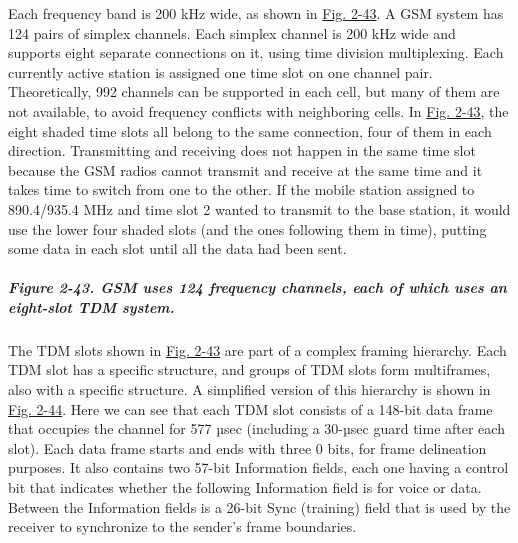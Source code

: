 Each frequency band is 200 kHz wide, as shown in
\protect\hyperlink{0130661023_ch02lev1sec6.htmlux5cux23ch02fig43}{Fig.
2-43}. A GSM system has 124 pairs of simplex channels. Each simplex
channel is 200 kHz wide and supports eight separate connections on it,
using time division multiplexing. Each currently active station is
assigned one time slot on one channel pair. Theoretically, 992 channels
can be supported in each cell, but many of them are not available, to
avoid frequency conflicts with neighboring cells. In
\protect\hyperlink{0130661023_ch02lev1sec6.htmlux5cux23ch02fig43}{Fig.
2-43}, the eight shaded time slots all belong to the same connection,
four of them in each direction. Transmitting and receiving does not
happen in the same time slot because the GSM radios cannot transmit and
receive at the same time and it takes time to switch from one to the
other. If the mobile station assigned to 890.4/935.4 MHz and time slot 2
wanted to transmit to the base station, it would use the lower four
shaded slots (and the ones following them in time), putting some data in
each slot until all the data had been sent.

\subparagraph[Figure 2-43. GSM uses 124 frequency channels, each of
which uses an eight-slot TDM
system.]{\texorpdfstring{\protect\hypertarget{0130661023_ch02lev1sec6.htmlux5cux23ch02fig43}{}{}Figure
2-43. GSM uses 124 frequency channels, each of which uses an eight-slot
TDM
system.}{Figure 2-43. GSM uses 124 frequency channels, each of which uses an eight-slot TDM system.}}


The TDM slots shown in
\protect\hyperlink{0130661023_ch02lev1sec6.htmlux5cux23ch02fig43}{Fig.
2-43} are part of a complex framing hierarchy. Each TDM slot has a
specific structure, and groups of TDM slots form multiframes, also with
a specific structure. A simplified version of this hierarchy is shown in
\protect\hyperlink{0130661023_ch02lev1sec6.htmlux5cux23ch02fig44}{Fig.
2-44}. Here we can see that each TDM slot consists of a 148-bit data
frame that occupies the channel for 577 µsec (including a 30-µsec guard
time after each slot). Each data frame starts and ends with three 0
bits, for frame delineation purposes. It also contains two 57-bit
{Information} fields, each one having a control bit that indicates
whether the following {Information} field is for voice or data. Between
the {Information} fields is a 26-bit {Sync} (training) field that is
used by the receiver to synchronize to the sender's frame boundaries.

